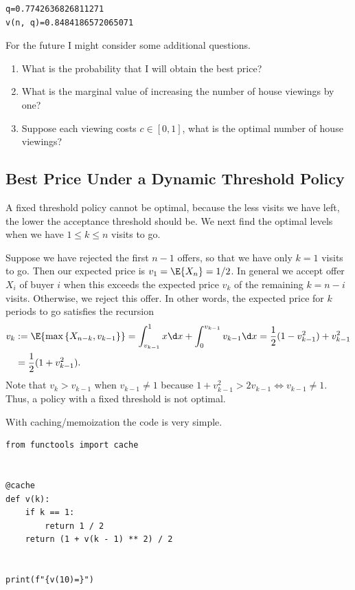 \documentclass[a4paper]{article}
\begin{document}
\begin{verbatim}
q=0.7742636826811271
v(n, q)=0.8484186572065071
\end{verbatim}


For the future I might consider some additional questions.

\begin{enumerate}
\item What is the probability that I will obtain the best price?
\item What is the marginal value of increasing the number of house viewings by one?
\item Suppose each viewing costs \(c\in [0, 1]\), what is the optimal number of house viewings?
\end{enumerate}
\subsection{Best Price Under a Dynamic  Threshold Policy}
\label{sec:org31c8647}

A fixed threshold policy cannot be optimal, because the less visits we have left, the lower the acceptance threshold should be.
We next find the optimal levels when we have \(1 \leq k \leq  n\) visits to go.

Suppose we have rejected the first \(n-1\) offers, so that we have only \(k=1\) visits to go.
Then our expected price is \(v_1 = \E{X_n} = 1/2\).
In general we accept offer \(X_{i}\) of buyer \(i\) when this exceeds the expected price \(v_{k}\) of the remaining \(k=n-i\) visits. Otherwise, we reject this offer. In other words, the expected price for \(k\) periods to go satisfies the recursion
\begin{align*}
v_k &:= \E{\max{X_{n-k}, v_{k-1}}}  = \int_{v_{k-1}}^1 x \d x + \int_0^{v_{k-1}} v_{k-1} \d x = \frac{1}{2}(1-v_{k-1}^2) + v_{k-1}^2 \\
&= \frac{1}{2}(1 + v_{k-1}^2).
\end{align*}
Note that  \(v_{k} > v_{k-1}\) when \(v_{k-1}\neq 1\) because \(1 + v_{k-1}^2 > 2 v_{k-1} \iff v_{k-1} \neq 1\). Thus, a policy with a fixed threshold is not optimal.


With caching/memoization the code is very simple.
\begin{verbatim}
from functools import cache


@cache
def v(k):
    if k == 1:
        return 1 / 2
    return (1 + v(k - 1) ** 2) / 2


print(f"{v(10)=}")
\end{verbatim}
\end{document}
